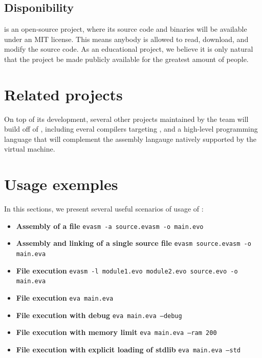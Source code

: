 \documentclass[11pt,twoside]{article}
\begin{document}
  \subsection{Disponibility}

   is an open-source project, where its source code and binaries will be available under an MIT license. This means anybody is allowed to read, download, and modify the source code. As an educational project, we believe it is only natural that the project be made publicly available for the greatest amount of people.

  \section{Related projects}

  On top of its development, several other projects maintained by the team will build off of , including everal compilers targeting , and a high-level programming language that will complement the assembly langauge natively supported by the virtual machine.

  \section{Usage exemples}

  In this sections, we present several useful scenarios of usage of :

  \begin{itemize}
    \item \textbf{Assembly of a file} \texttt{evasm -a source.evasm -o main.evo}
    \item \textbf{Assembly and linking of a single source file} \texttt{evasm source.evasm -o main.eva}
    \item \textbf{File execution} \texttt{evasm -l module1.evo module2.evo source.evo -o main.eva}
    \item \textbf{File execution} \texttt{eva main.eva}
    \item \textbf{File execution with debug} \texttt{eva main.eva --debug}
    \item \textbf{File execution with memory limit} \texttt{eva main.eva --ram 200}
    \item \textbf{File execution with explicit loading of stdlib} \texttt{eva main.eva --std}
  \end{itemize}

  \cleardoublepage

  
\end{document}
